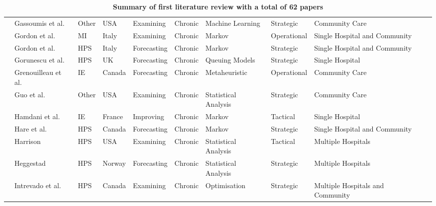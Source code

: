 \documentclass[thesis.tex]{subfiles}
\begin{document}
\begin{landscape}
\begin{table}[]
{\begin{tabular}{@{}llllllllll@{}}
  \cite{Gassoumis} & Gassoumis et al. & Other & USA & Examining &Chronic& Machine Learning & Strategic  &Community Care\\ 
  \cite{Gordon1} & Gordon et al. & MI & Italy & Examining & Chronic & Markov &Operational & Single Hospital and Community\\
  \cite{Gordon2} & Gordon et al. & HPS & Italy & Forecasting & Chronic & Markov & Strategic& Single Hospital and Community \\
  \cite{Gorunescu} & Gorunescu et al. &HPS & UK &Forecasting & Chronic & Queuing Models & Strategic & Single Hospital \\
  \cite{Grenouilleau} & Grenouilleau et al. & IE & Canada &Forecasting& Chronic &Metaheuristic &Operational & Community Care \\
  \cite{Guo} & Guo et al. & Other & USA & Examining & Chronic& Statistical Analysis & Strategic & Community Care \\
  \cite{Hamdani} & Hamdani et al. & IE& France & Improving &Chronic & Markov & Tactical & Single Hospital \\
  \cite{Hare} & Hare et al. &HPS & Canada & Forecasting &Chronic & Markov & Strategic & Single Hospital and Community \\
 \cite{Harrison} & Harrison & HPS & USA & Examining & Chronic & Statistical Analysis & Tactical& Multiple Hospitals \\
 \cite{Heggestad} & Heggestad & HPS & Norway & Forecasting & Chronic & Statistical Analysis & Strategic & Multiple Hospitals \\
     \cite{Intrevado} & Intrevado et al. & HPS & Canada& Examining & Chronic & Optimisation & Strategic & Multiple Hospitals and Community \\

       \bottomrule
    \end{tabular}
    }   
    \label{app:tablr1}
    \caption{\textbf{Summary of first literature review with a total of 62 papers}}
\end{table}


\end{landscape}
\end{document}
